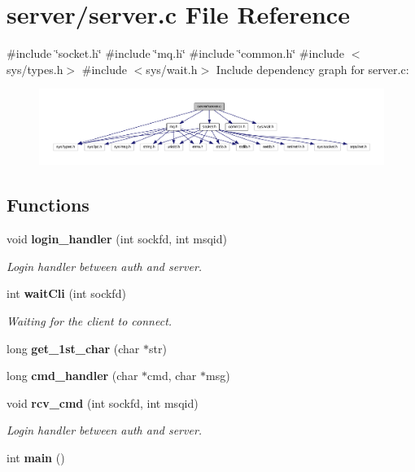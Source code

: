 \section{server/server.c File Reference}
\label{server_8c}
{\ttfamily \#include \char`\"{}socket.\+h\char`\"{}}\newline
{\ttfamily \#include \char`\"{}mq.\+h\char`\"{}}\newline
{\ttfamily \#include \char`\"{}common.\+h\char`\"{}}\newline
{\ttfamily \#include $<$sys/types.\+h$>$}\newline
{\ttfamily \#include $<$sys/wait.\+h$>$}\newline
Include dependency graph for server.\+c\+:\nopagebreak
\begin{figure}[H]
\begin{center}
\leavevmode
\includegraphics[width=350pt]{server_8c__incl}
\end{center}
\end{figure}
\subsection*{Functions}
\begin{DoxyCompactItemize}
\item 
void \textbf{ login\+\_\+handler} (int sockfd, int msqid)
\begin{DoxyCompactList}\small\item\em Login handler between auth and server. \end{DoxyCompactList}\item 
int \textbf{ wait\+Cli} (int sockfd)
\begin{DoxyCompactList}\small\item\em Waiting for the client to connect. \end{DoxyCompactList}\item 
long \textbf{ get\+\_\+1st\+\_\+char} (char $\ast$str)
\item 
long \textbf{ cmd\+\_\+handler} (char $\ast$cmd, char $\ast$msg)
\item 
void \textbf{ rcv\+\_\+cmd} (int sockfd, int msqid)
\begin{DoxyCompactList}\small\item\em Login handler between auth and server. \end{DoxyCompactList}\item 
int \textbf{ main} ()
\end{DoxyCompactItemize}


